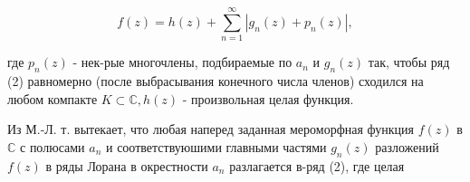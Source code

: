 \documentclass[10pt]{article}
\begin{document}
\[

f(z)=h(z)+\sum_{n=1}^{\infty}\left|g_{n}(z)+p_{n}(z)\right|,

\]



где $p_{n}(z)$ - нек-рые многочлены, подбираемые по $a_{n}$ и $g_{n}(z)$ так, чтобы ряд (2) равномерно (после выбрасывания конечного числа членов) сходился на любом компакте $K \subset \mathbb{C}, h(z)$ - произвольная целая функция.



Из М.-Л. т. вытекает, что любая наперед заданная мероморфная функция $f(z)$ в $\mathbb{C}$ с полюсами $a_{n}$ и соответствуюшими главными частями $g_{n}(z)$ разложений $f(z)$ в ряды Лорана в окрестности $a_{n}$ разлагается в-ряд (2), где целая
\end{document}
